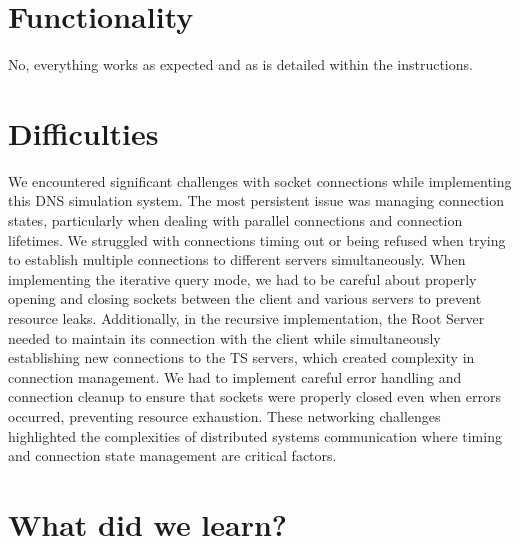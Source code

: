 \documentclass{article}
\begin{document}
\section{Functionality}

No, everything works as expected and as is detailed within the instructions.


\section{Difficulties}

We encountered significant challenges with socket connections while implementing this DNS simulation system. The most persistent issue was managing connection states, particularly when dealing with parallel connections and connection lifetimes. We struggled with connections timing out or being refused when trying to establish multiple connections to different servers simultaneously. When implementing the iterative query mode, we had to be careful about properly opening and closing sockets between the client and various servers to prevent resource leaks. Additionally, in the recursive implementation, the Root Server needed to maintain its connection with the client while simultaneously establishing new connections to the TS servers, which created complexity in connection management. We had to implement careful error handling and connection cleanup to ensure that sockets were properly closed even when errors occurred, preventing resource exhaustion. These networking challenges highlighted the complexities of distributed systems communication where timing and connection state management are critical factors.

\section{What did we learn?}
\end{document}
